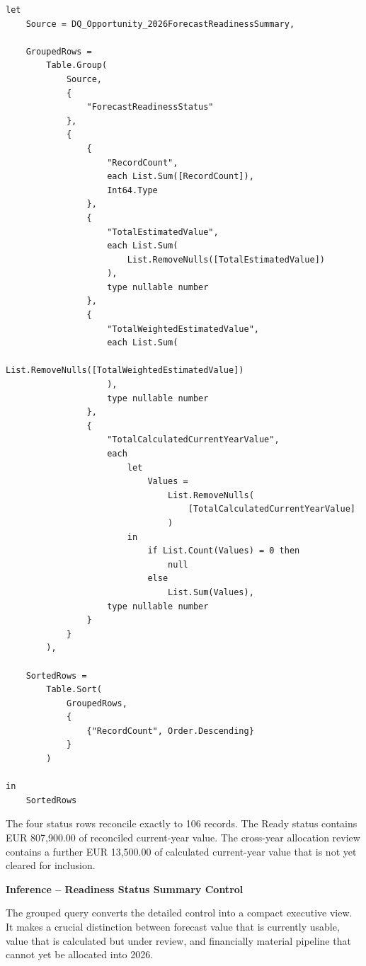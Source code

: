 \documentclass[11pt,a4paper]{article}
\begin{document}
\begin{lstlisting}[style=powerquery]
let
    Source = DQ_Opportunity_2026ForecastReadinessSummary,

    GroupedRows =
        Table.Group(
            Source,
            {
                "ForecastReadinessStatus"
            },
            {
                {
                    "RecordCount",
                    each List.Sum([RecordCount]),
                    Int64.Type
                },
                {
                    "TotalEstimatedValue",
                    each List.Sum(
                        List.RemoveNulls([TotalEstimatedValue])
                    ),
                    type nullable number
                },
                {
                    "TotalWeightedEstimatedValue",
                    each List.Sum(
                        List.RemoveNulls([TotalWeightedEstimatedValue])
                    ),
                    type nullable number
                },
                {
                    "TotalCalculatedCurrentYearValue",
                    each
                        let
                            Values =
                                List.RemoveNulls(
                                    [TotalCalculatedCurrentYearValue]
                                )
                        in
                            if List.Count(Values) = 0 then
                                null
                            else
                                List.Sum(Values),
                    type nullable number
                }
            }
        ),

    SortedRows =
        Table.Sort(
            GroupedRows,
            {
                {"RecordCount", Order.Descending}
            }
        )

in
    SortedRows
\end{lstlisting}

The four status rows reconcile exactly to 106 records. The Ready status contains
EUR 807,900.00 of reconciled current-year value. The cross-year allocation
review contains a further EUR 13,500.00 of calculated current-year value that is
not yet cleared for inclusion.

\begin{inferencebox}

\textbf{Inference -- Readiness Status Summary Control}

The grouped query converts the detailed control into a compact executive view.
It makes a crucial distinction between forecast value that is currently usable,
value that is calculated but under review, and financially material pipeline that
cannot yet be allocated into 2026.

\end{inferencebox}
\end{document}
